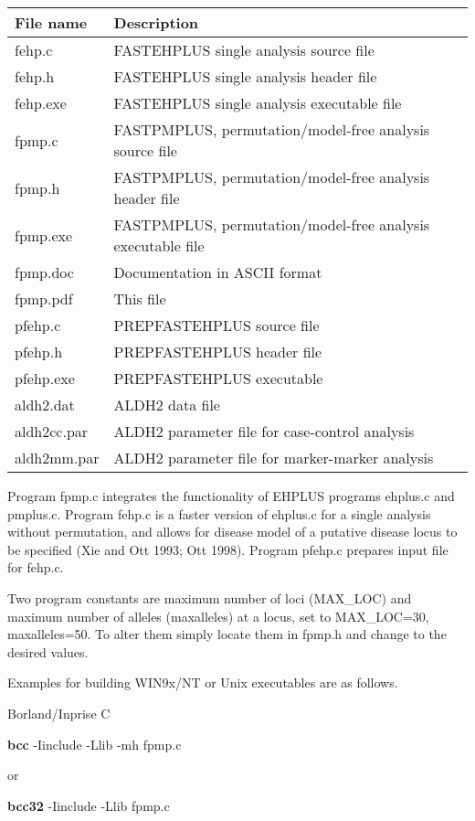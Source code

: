 \documentclass[11pt]{article}
\begin{document}
\medskip
{\small
\begin{tabular}{ll}
\hline
File name  & Description\\
\hline
fehp.c     & FASTEHPLUS single analysis source file\\
fehp.h     & FASTEHPLUS single analysis header file\\
fehp.exe   & FASTEHPLUS single analysis executable file\\
fpmp.c     & FASTPMPLUS, permutation/model-free analysis source file\\
fpmp.h     & FASTPMPLUS, permutation/model-free analysis header file\\
fpmp.exe   & FASTPMPLUS, permutation/model-free analysis executable file\\
fpmp.doc   & Documentation in ASCII format\\
fpmp.pdf   & This file\\
pfehp.c    & PREPFASTEHPLUS source file\\
pfehp.h    & PREPFASTEHPLUS header file\\
pfehp.exe  & PREPFASTEHPLUS executable\\
aldh2.dat  & ALDH2 data file\\
aldh2cc.par& ALDH2 parameter file for case-control analysis\\
aldh2mm.par& ALDH2 parameter file for marker-marker analysis\\
\hline
\end{tabular}
}

\medskip
Program fpmp.c integrates the functionality of EHPLUS programs ehplus.c and
pmplus.c.  Program fehp.c is a faster version of ehplus.c for a single analysis
without permutation, and allows for disease model of a putative disease locus
to be specified (Xie and Ott 1993; Ott 1998).  Program pfehp.c prepares input
file for fehp.c.

Two program constants are maximum number of loci (MAX\_LOC) and maximum number
of alleles (maxalleles) at a locus, set to MAX\_LOC=30, maxalleles=50.  To alter
them simply locate them in fpmp.h and change to the desired values.

Examples for building WIN9x/NT or Unix executables are as follows.

\medskip
Borland/Inprise C

\medskip
{\bf bcc} -Iinclude -Llib -mh fpmp.c
\medskip

or

\medskip
{\bf bcc32} -Iinclude -Llib fpmp.c
\end{document}
